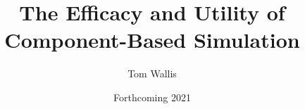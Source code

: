 \title{The Efficacy and Utility of Component-Based Simulation}
\author{Tom Wallis}
\date{Forthcoming 2021}





\usepackage{natbib}



\usepackage[obeyFinal]{todonotes}
\usepackage{hyperref}
\usepackage{cleveref}
\usepackage{listings}
\usepackage{csquotes}




